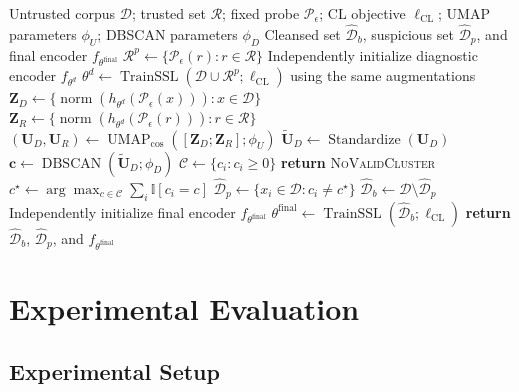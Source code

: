\documentclass[10pt,journal]{IEEEtran}
\begin{document}
\begin{algorithm}[!t]
\caption{Reference-Assisted Poisoned-Sample Cleansing}
\label{alg:cleansing}
\begin{algorithmic}[1]
\Require Untrusted corpus $\mathcal{D}$; trusted set $\mathcal{R}$;
fixed probe $\mathcal{P}_{\epsilon}$; CL objective
$\ell_{\mathrm{CL}}$; UMAP parameters $\phi_U$; DBSCAN parameters
$\phi_D$
\Ensure Cleansed set $\widehat{\mathcal{D}}_b$, suspicious set
$\widehat{\mathcal{D}}_p$, and final encoder $f_{\theta^{\mathrm{final}}}$
\State $\mathcal{R}^{p}\gets
\{\mathcal{P}_{\epsilon}(r):r\in\mathcal{R}\}$
\State Independently initialize diagnostic encoder $f_{\theta^{d}}$
\State $\theta^{d}\gets
\operatorname{TrainSSL}(\mathcal{D}\cup\mathcal{R}^{p};
\ell_{\mathrm{CL}})$ using the same augmentations
\State $\mathbf{Z}_{D}\gets
\{\operatorname{norm}(h_{\theta^{d}}(\mathcal{P}_{\epsilon}(x))):
x\in\mathcal{D}\}$
\State $\mathbf{Z}_{R}\gets
\{\operatorname{norm}(h_{\theta^{d}}(\mathcal{P}_{\epsilon}(r))):
r\in\mathcal{R}\}$
\State $(\mathbf{U}_{D},\mathbf{U}_{R})\gets
\operatorname{UMAP}_{\mathrm{cos}}([\mathbf{Z}_{D};\mathbf{Z}_{R}];
\phi_U)$
\State $\widetilde{\mathbf{U}}_{D}\gets
\operatorname{Standardize}(\mathbf{U}_{D})$
\State $\mathbf{c}\gets
\operatorname{DBSCAN}(\widetilde{\mathbf{U}}_{D};\phi_D)$
\State $\mathcal{C}\gets\{c_i:c_i\geq0\}$
    \State \textbf{return} \textsc{NoValidCluster}
\EndIf
\State $c^{\star}\gets
\arg\max_{c\in\mathcal{C}}\sum_i\mathbb{I}[c_i=c]$
\State $\widehat{\mathcal{D}}_p\gets
\{x_i\in\mathcal{D}:c_i\neq c^{\star}\}$
\State $\widehat{\mathcal{D}}_b\gets
\mathcal{D}\setminus\widehat{\mathcal{D}}_p$
\State Independently initialize final encoder
$f_{\theta^{\mathrm{final}}}$
\State $\theta^{\mathrm{final}}\gets
\operatorname{TrainSSL}(\widehat{\mathcal{D}}_b;
\ell_{\mathrm{CL}})$
\State \textbf{return} $\widehat{\mathcal{D}}_b$,
$\widehat{\mathcal{D}}_p$, and $f_{\theta^{\mathrm{final}}}$
\end{algorithmic}
\end{algorithm}

\section{Experimental Evaluation}\label{sec:experiment}
\subsection{Experimental Setup}
\label{sec:experimental_setup}
\end{document}
